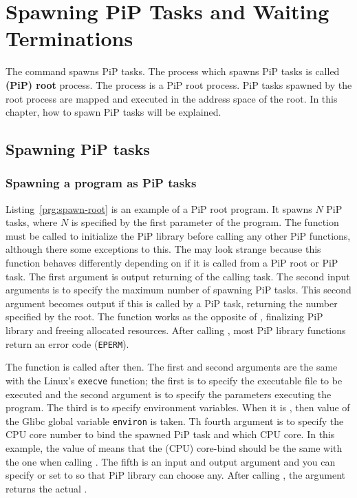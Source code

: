 
\section{Spawning PiP Tasks and Waiting Terminations}

The  command spawns PiP tasks. The
process which spawns PiP tasks is called {\bf (PiP) root} process. The
 process is a PiP root process. 
PiP tasks spawned by the root process are mapped and executed in the
address space of the root. In this chapter, how to spawn PiP tasks
will be explained.

\subsection{Spawning PiP tasks}

\subsubsection{Spawning a program as PiP tasks}

Listing~\ref{prg:spawn-root} is an example of a PiP root program. It
spawns $N$ PiP tasks, where $N$ is specified by the first parameter
of the program. The  function must be called to
initialize the PiP library before calling any other PiP functions,
although there some exceptions to this. The  may
look strange because this function behaves differently depending
on if it is called from a PiP root or PiP task. The first argument is
output returning {\PIPID} of the calling task. The second input
arguments is to specify the maximum number of spawning PiP tasks. This
second argument becomes output if this is called by a PiP task,
returning the number specified by the root.
The  function works as the opposite of
, finalizing PiP library and freeing allocated 
resources. After calling , most PiP library
functions return an error code ({\tt EPERM}).

The  function is called after then. The first and
second arguments are the same with the Linux's {\tt execve}
function; the first is to specify the executable file to be executed
and the second argument is to specify the parameters executing the
program. The third is to specify environment variables. When it is
{\NULL}, then value of the Glibc global variable {\tt environ} is
taken. Th fourth argument is to specify the CPU core number to bind
the spawned PiP task and which CPU core. In this example, the value of
 means that the (CPU) core-bind should be
the same with the one when calling . The fifth
is an input and output argument and you can specify {\PIPID} or
set to  so that PiP library can choose
any. After calling , the argument returns the
actual {\PIPID}. 


